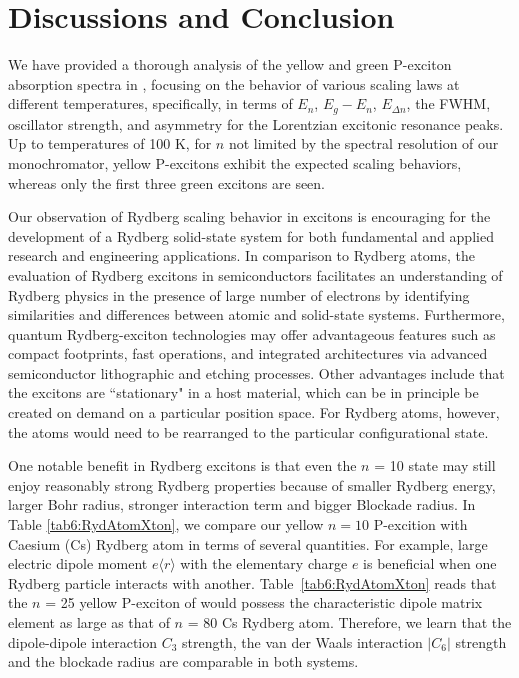 \documentclass[aps,reprint,amsmath,amssymb,prb]{revtex4-1}
\begin{document}
\section{Discussions and Conclusion}

We have provided a thorough analysis of the yellow and green P-exciton absorption spectra in , focusing on the behavior of various scaling laws at different temperatures, specifically, in terms of $E_n$, $E_g-E_n$, $E_{\Delta n}$, the FWHM, oscillator strength, and asymmetry for the Lorentzian excitonic resonance peaks. Up to temperatures of 100 K, for $n$ not limited by the spectral resolution of our monochromator, yellow P-excitons exhibit the expected scaling behaviors, whereas only the first three green excitons are seen.

Our observation of Rydberg scaling behavior in  excitons is encouraging for the development of a Rydberg solid-state system for both fundamental and applied research and engineering applications. In comparison to Rydberg atoms, the evaluation of Rydberg excitons in semiconductors facilitates an understanding of Rydberg physics in the presence of large number of electrons by identifying similarities and differences between atomic and solid-state systems. Furthermore, quantum Rydberg-exciton technologies may offer advantageous features such as compact footprints, fast operations, and integrated architectures via advanced semiconductor lithographic and etching processes.  Other advantages include that the excitons are ``stationary" in a host material, which can be in principle be created on demand on a particular position space. For Rydberg atoms, however, the atoms would need to be rearranged to the particular configurational state. 

One notable benefit in Rydberg excitons is that even the $n$ = 10 state may still enjoy reasonably strong Rydberg properties because of smaller Rydberg energy, larger Bohr radius, stronger interaction term and bigger Blockade radius. In Table \ref{tab6:RydAtomXton}, we compare our  yellow $n=10$ P-excition with Caesium (Cs) Rydberg atom in terms of several quantities. For example, large electric dipole moment $e \langle r \rangle$ with the elementary charge  $e$ is beneficial when one Rydberg particle interacts with another. Table~\ref{tab6:RydAtomXton} reads that the $n$ = 25 yellow P-exciton of  would possess the characteristic dipole matrix element as large as that of $n$ = 80 Cs Rydberg atom. Therefore, we learn that the dipole-dipole interaction $C_3$ strength, the van der Waals interaction $|C_6|$ strength and the blockade radius are comparable in both systems.
   
\end{document}
